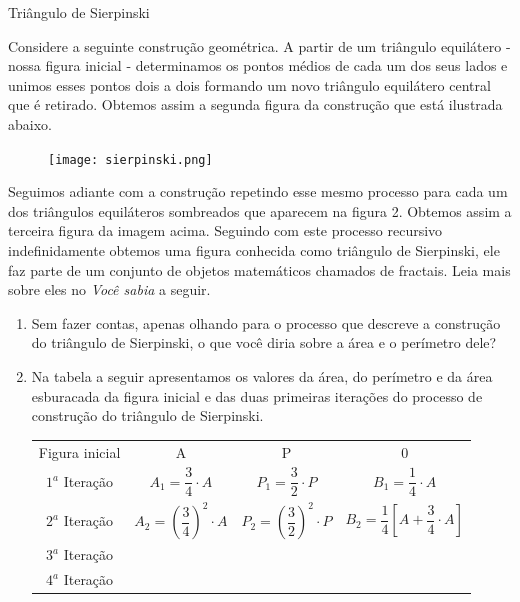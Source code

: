 \begin{task}{Triângulo de Sierpinski}

Considere a seguinte construção geométrica. A partir de um triângulo equilátero - nossa figura inicial - determinamos os pontos médios de cada um dos seus lados e unimos esses pontos dois a dois formando um novo triângulo equilátero central que é retirado. Obtemos assim a segunda figura da construção que está ilustrada abaixo.

\begin{figure}[H]
\centering
\texttt{[image: sierpinski.png]}
\end{figure}

Seguimos adiante com a construção repetindo esse mesmo processo para cada um dos triângulos equiláteros sombreados que aparecem na figura 2. Obtemos assim a terceira figura da imagem acima. Seguindo com este processo recursivo indefinidamente obtemos uma figura conhecida como triângulo de Sierpinski, ele faz parte de um conjunto de objetos matemáticos chamados de fractais. Leia mais sobre eles no \textit{Você sabia} a seguir.

\begin{enumerate}

\item{}
Sem fazer contas, apenas olhando para o processo que descreve a construção do triângulo de Sierpinski, o que você diria sobre a área e o perímetro dele?

\item{}
Na tabela a seguir apresentamos os valores da área, do perímetro e da área esburacada da figura inicial e das duas primeiras iterações do processo de construção do triângulo de Sierpinski.

\begin{table}[H]
\centering
\setlength\tabulinesep{2.5pt}
\begin{tabu}{|c|c|c|c|}
\hline
{} &  &  &  \\ 
\hline
Figura inicial & A                                       & P                                       & 0                                                   \\ \hline
$1^a$ Iteração             & $A_1=\dfrac{3}{4}\cdot A$               & $P_1=\dfrac{3}{2}\cdot P$               & $B_1=\dfrac{1}{4}\cdot A$                           \\ \hline
$2^a$ Iteração             & $A_2=\left(\dfrac{3}{4}\right)^2\cdot A$ & $P_2=\left(\dfrac{3}{2}\right)^2\cdot P$ & $B_2=\dfrac{1}{4}\left[A+\dfrac{3}{4}\cdot A\right]$ \\ \hline
$3^a$ Iteração             &                    &                    &                                \\ \hline
$4^a$ Iteração             &                    &                    &                                \\ \hline
\end{tabu}
\end{table}


\end{enumerate}
\end{task}

